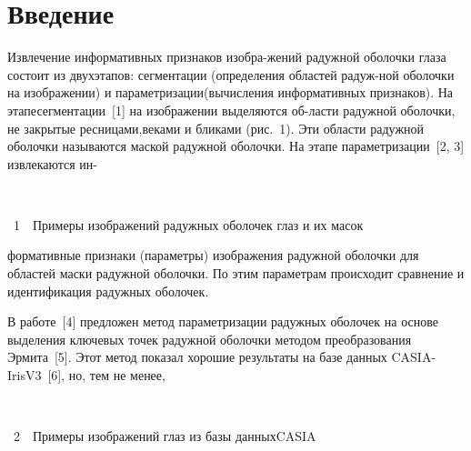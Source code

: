       \begin{multicols}{2}
      
            \label{st\stat}
            
\section{Введение}

Извлечение информативных признаков изобра-\linebreak жений радужной оболочки глаза 
состоит из двух\linebreak этапов: сегментации (определения областей радуж-\linebreak ной оболочки на 
изображении) и параметризации\linebreak (вычисления информативных признаков). На 
этапе\linebreak сегментации~[1] на изображении выделяются об-\linebreak ласти радужной оболочки, 
не закрытые ресницами,\linebreak веками и бликами (рис.~1). Эти области радужной 
оболочки  называются маской радужной оболочки.
 На этапе параметризации~[2, 3] 
извлекаются ин-\linebreak
\begin{center} %
\mbox{%
\epsfxsize=78mm
}
\end{center}
\vspace*{6pt}
{{\figurename~1}\ \ \small{Примеры изображений радужных оболочек глаз и их масок}}

\addtocounter{figure}{1}

\noindent
формативные признаки (параметры) изображения радужной 
оболочки для областей маски радужной оболочки. По этим параметрам 
происходит сравнение и идентификация радужных оболочек. 



В работе~[4] предложен метод параметризации радужных оболочек на основе 
выделения ключевых
 точек радужной оболочки методом преобразования
 Эрмита~[5]. Этот метод показал хорошие результаты
  на базе данных 
CASIA-IrisV3~[6], но, тем не менее,\linebreak
\begin{center} %
\vspace*{6pt}
\mbox{%
\epsfxsize=78mm
}
\end{center}
\vspace*{6pt}
{{\figurename~2}\ \ \small{Примеры изображений глаз из базы данных\protect\linebreak CASIA}}


\end{multicols}
